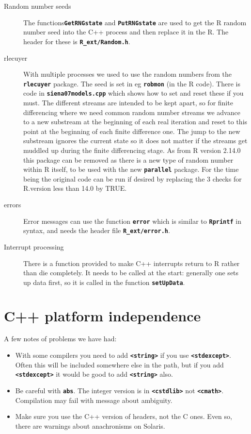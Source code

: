 \documentclass[12pt, a4paper]{article}
\renewcommand{\=}{\,=\,}
\newcommand{\+}{\,+\,}
\newcommand{\sfn}[1]{\textbf{\texttt{#1}}}
\begin{document}
\begin{description}
\item[Random number seeds] The functions\sfn{GetRNGstate} and
\sfn{PutRNGstate}  are used to get the R random number seed into the C++
process and then replace it in the R. The header for these is
\sfn{R\_ext/Random.h}.
\item[rlecuyer]
With multiple processes we used to use the random numbers from the \sfn{rlecuyer}
package. The seed is set in eg \sfn{robmon} (in the R code). There is code in
\sfn{siena07models.cpp} which shows how to set and reset these if you must. The
different streams are intended to be kept apart, so for finite differencing
where we need common random number streams we advance to a new substream at
the beginning of each real iteration and reset to this point at the beginning of
each finite difference one. The jump to the new substream ignores the current
state so it does not matter if the streams get muddled up during the finite
differencing stage. As from R version 2.14.0 this package can be removed as
there is a new type of random number within R itself, to be used with the
new \sfn{parallel} package. For the time being the original code can be run if
desired by replacing the 3 checks for R.version less than 14.0 by TRUE.
\item[errors]
Error messages can use the function \sfn{error} which is similar to
\sfn{Rprintf} in syntax, and needs the header file \sfn{R\_ext/error.h}.
\item[Interrupt processing] There is a function provided to make C++ interrupts
  return to R rather than die completely. It needs to be called at the start:
  generally one sets up data first, so it is called in the function
  \sfn{setUpData}.
\end{description}
\section{C++ platform independence}
A few notes of problems we have had:
\begin{itemize}
\item With some compilers you need to add \sfn{<string>} if you use
  \sfn{<stdexcept>}. Often this will be included somewhere else in the path, but
  if you add \sfn{<stdexcept>} it would be good to add \sfn{<string>} also.
  \item Be careful with \sfn{abs}. The integer version is in \sfn{<cstdlib>} not
    \sfn{<cmath>}. Compilation may fail with message about ambiguity.
\item Make sure you use the C++ version of headers, not the C ones. Even so,
  there are warnings about anachronisms on Solaris.
\end{itemize}
\end{document}
